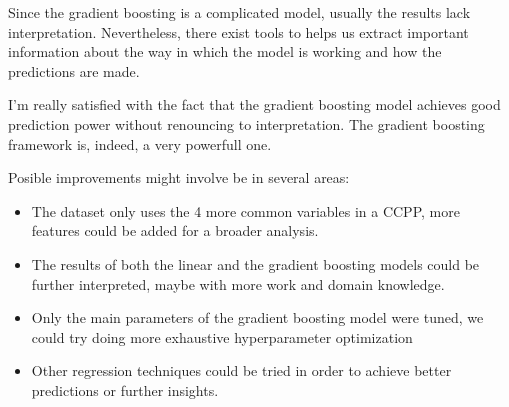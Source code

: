 Since the gradient boosting is a complicated model, usually the results lack interpretation. Nevertheless, there exist tools to helps us extract important information about the way in which the model is working and how the predictions are made.

I'm really satisfied with the fact that the gradient boosting model achieves good prediction power without renouncing to interpretation. The gradient boosting framework is, indeed, a very powerfull one.

Posible improvements might involve be in several areas:
\begin{itemize}
    \item The dataset only uses the 4 more common variables in a CCPP, more features could be added for a broader analysis.
    \item The results of both the linear and the gradient boosting models could be further interpreted, maybe with more work and domain knowledge.
    \item Only the main parameters of the gradient boosting model were tuned, we could try doing more exhaustive hyperparameter optimization
    \item Other regression techniques could be tried in order to achieve better predictions or further insights.
\end{itemize}



